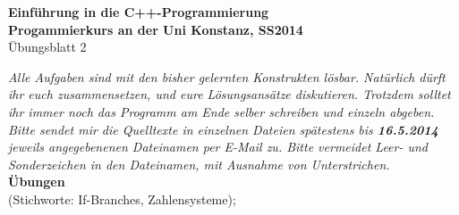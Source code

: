 \documentclass[paper=A4, pagesize, DIV=calc, smallheadings,
fontsize=11pt, expansion=false]{scrreprt}
\begin{document}
\pagestyle{empty}
\huge
\begin{center}
 \textbf{Einführung in die C++-Programmierung}\\
\Large
\textbf{Progammierkurs an der Uni Konstanz, SS2014}\\
\large{Übungsblatt 2}
\end{center}
\normalsize
\textit{Alle Aufgaben sind mit den bisher gelernten Konstrukten lösbar. Natürlich dürft ihr euch zusammensetzen, und eure Lösungsansätze diskutieren. Trotzdem solltet ihr immer noch das Programm am Ende selber schreiben und einzeln abgeben.
  Bitte sendet mir die Quelltexte in einzelnen Dateien spätestens bis \textbf{\emph{16.5.2014}} jeweils angegebenenen Dateinamen per E-Mail zu. Bitte vermeidet Leer- und Sonderzeichen in den Dateinamen, mit Ausnahme von Unterstrichen.}\\
\large
\textbf{Übungen}\\
(Stichworte: If-Branches, Zahlensysteme);
\normalsize
\end{document}
